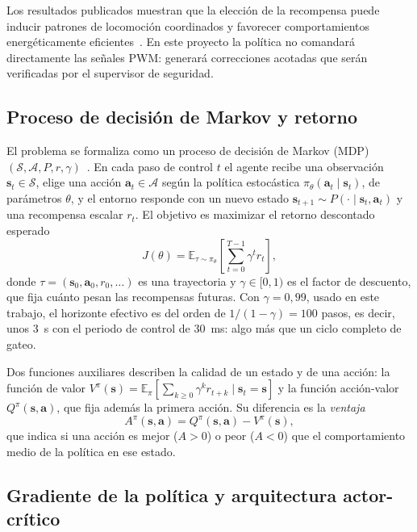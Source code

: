 Los resultados publicados muestran que la elección de la recompensa puede inducir patrones de locomoción coordinados y favorecer comportamientos energéticamente eficientes~\cite{heess2017emergence,fu2021energy}. En este proyecto la política no comandará directamente las señales PWM: generará correcciones acotadas que serán verificadas por el supervisor de seguridad.

\subsection{Proceso de decisión de Markov y retorno}

El problema se formaliza como un proceso de decisión de Markov (MDP) $(\mathcal{S},\mathcal{A},P,r,\gamma)$~\cite{sutton2018rl}. En cada paso de control $t$ el agente recibe una observación $\mathbf{s}_t\in\mathcal{S}$, elige una acción $\mathbf{a}_t\in\mathcal{A}$ según la política estocástica $\pi_\theta(\mathbf{a}_t\mid\mathbf{s}_t)$, de parámetros $\theta$, y el entorno responde con un nuevo estado $\mathbf{s}_{t+1}\sim P(\cdot\mid\mathbf{s}_t,\mathbf{a}_t)$ y una recompensa escalar $r_t$. El objetivo es maximizar el retorno descontado esperado
\begin{equation}
    J(\theta)=\mathbb{E}_{\tau\sim\pi_\theta}\left[\sum_{t=0}^{T-1}\gamma^{t}r_t\right],
    \label{eq:retorno}
\end{equation}
donde $\tau=(\mathbf{s}_0,\mathbf{a}_0,r_0,\ldots)$ es una trayectoria y $\gamma\in[0,1)$ es el factor de descuento, que fija cuánto pesan las recompensas futuras. Con $\gamma=0{,}99$, usado en este trabajo, el horizonte efectivo es del orden de $1/(1-\gamma)=100$ pasos, es decir, unos 3~s con el periodo de control de 30~ms: algo más que un ciclo completo de gateo.

Dos funciones auxiliares describen la calidad de un estado y de una acción: la función de valor $V^{\pi}(\mathbf{s})=\mathbb{E}_\pi[\sum_{k\ge0}\gamma^k r_{t+k}\mid\mathbf{s}_t=\mathbf{s}]$ y la función acción-valor $Q^{\pi}(\mathbf{s},\mathbf{a})$, que fija además la primera acción. Su diferencia es la \emph{ventaja}
\begin{equation}
    A^{\pi}(\mathbf{s},\mathbf{a})=Q^{\pi}(\mathbf{s},\mathbf{a})-V^{\pi}(\mathbf{s}),
\end{equation}
que indica si una acción es mejor ($A>0$) o peor ($A<0$) que el comportamiento medio de la política en ese estado.

\subsection{Gradiente de la política y arquitectura actor-crítico}


